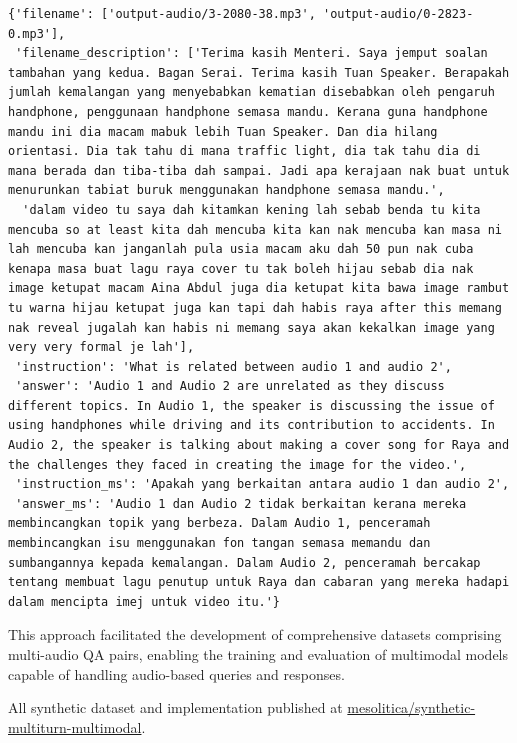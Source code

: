\documentclass[preprint]{article}
\begin{document}
\begin{lstlisting}[breaklines=true]
  {'filename': ['output-audio/3-2080-38.mp3', 'output-audio/0-2823-0.mp3'],
 'filename_description': ['Terima kasih Menteri. Saya jemput soalan tambahan yang kedua. Bagan Serai. Terima kasih Tuan Speaker. Berapakah jumlah kemalangan yang menyebabkan kematian disebabkan oleh pengaruh handphone, penggunaan handphone semasa mandu. Kerana guna handphone mandu ini dia macam mabuk lebih Tuan Speaker. Dan dia hilang orientasi. Dia tak tahu di mana traffic light, dia tak tahu dia di mana berada dan tiba-tiba dah sampai. Jadi apa kerajaan nak buat untuk menurunkan tabiat buruk menggunakan handphone semasa mandu.',
  'dalam video tu saya dah kitamkan kening lah sebab benda tu kita mencuba so at least kita dah mencuba kita kan nak mencuba kan masa ni lah mencuba kan janganlah pula usia macam aku dah 50 pun nak cuba kenapa masa buat lagu raya cover tu tak boleh hijau sebab dia nak image ketupat macam Aina Abdul juga dia ketupat kita bawa image rambut tu warna hijau ketupat juga kan tapi dah habis raya after this memang nak reveal jugalah kan habis ni memang saya akan kekalkan image yang very very formal je lah'],
 'instruction': 'What is related between audio 1 and audio 2',
 'answer': 'Audio 1 and Audio 2 are unrelated as they discuss different topics. In Audio 1, the speaker is discussing the issue of using handphones while driving and its contribution to accidents. In Audio 2, the speaker is talking about making a cover song for Raya and the challenges they faced in creating the image for the video.',
 'instruction_ms': 'Apakah yang berkaitan antara audio 1 dan audio 2',
 'answer_ms': 'Audio 1 dan Audio 2 tidak berkaitan kerana mereka membincangkan topik yang berbeza. Dalam Audio 1, penceramah membincangkan isu menggunakan fon tangan semasa memandu dan sumbangannya kepada kemalangan. Dalam Audio 2, penceramah bercakap tentang membuat lagu penutup untuk Raya dan cabaran yang mereka hadapi dalam mencipta imej untuk video itu.'}
\end{lstlisting}

This approach facilitated the development of comprehensive datasets comprising multi-audio QA pairs, enabling the training and evaluation of multimodal models capable of handling audio-based queries and responses.

All synthetic dataset and implementation published at \href{https://huggingface.co/datasets/mesolitica/synthetic-multiturn-multimodal#multi-audio}{mesolitica/synthetic-multiturn-multimodal}.
\end{document}
